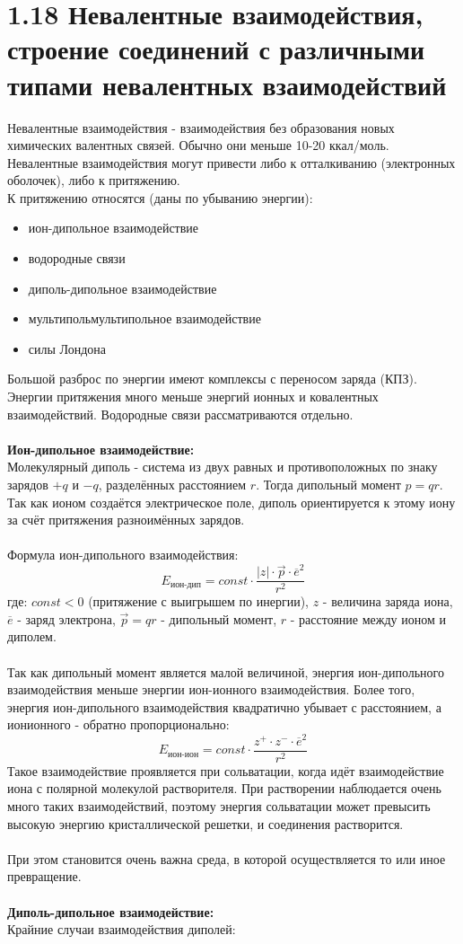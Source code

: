 
\section*{1.18 Невалентные взаимодействия, строение соединений с различными типами невалентных взаимодействий}
Невалентные взаимодействия - взаимодействия без образования
новых химических валентных связей. Обычно они меньше 10-20
ккал/моль. \\
Невалентные взаимодействия могут привести либо к
отталкиванию (электронных оболочек), либо к притяжению. \\ 
К притяжению относятся (даны по убыванию
энергии): 
\begin{itemize}
	\item ион-дипольное взаимодействие
	\item водородные связи
	\item диполь-дипольное взаимодействие
	\item мультипольмультипольное взаимодействие
	\item силы Лондона
\end{itemize} 
Большой разброс по энергии имеют комплексы с
переносом заряда (КПЗ). Энергии притяжения много меньше энергий
ионных и ковалентных взаимодействий. Водородные связи
рассматриваются отдельно. \\ \\
\textbf{Ион-дипольное взаимодействие:} \\
	Молекулярный диполь - система из двух равных и
	противоположных по знаку зарядов $+q$ и $-q$, разделённых расстоянием
	$r$. Тогда дипольный момент $p=qr$. Так как ионом создаётся
	электрическое поле, диполь ориентируется к этому иону за счёт
	притяжения разноимённых зарядов. \\ \\
	Формула ион-дипольного взаимодействия:
	\[
	E_{\text{ион-дип}} = const \cdot \dfrac{|z| \cdot \vec{p} \cdot \overline{e}^2}{r^2}
	\]
	где: $const < 0$ (притяжение с выигрышем по инергии), $z$ - величина заряда иона, $\overline{e}$ - заряд электрона,  $\vec{p}=qr$ - дипольный момент, $r$ - расстояние между ионом и диполем. \\ \\
	Так как дипольный момент является малой величиной, энергия
	ион-дипольного взаимодействия меньше энергии ион-ионного
	взаимодействия. Более того, энергия ион-дипольного
	взаимодействия квадратично убывает с расстоянием, а ионионного - обратно пропорционально:
	\[
	E_{\text{ион-ион}} = const \cdot \dfrac{z^+ \cdot z^- \cdot \overline{e}^2 }{r^2}
	\]
	Такое взаимодействие проявляется при сольватации, когда идёт
	взаимодействие иона с полярной молекулой растворителя. При
	растворении наблюдается очень много таких взаимодействий,
	поэтому энергия сольватации может превысить высокую энергию
	кристаллической решетки, и соединения растворится.  \\ \\
	При этом становится очень важна среда, в которой осуществляется
	то или иное превращение. \\ \\
	\textbf{Диполь-дипольное взаимодействие:} \\
	Крайние случаи взаимодействия диполей:
	
